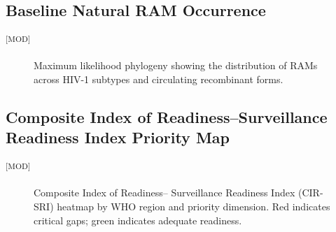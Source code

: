 \documentclass[12pt]{article}
\newcommand{\GradeModerate}{\textsuperscript{\textsf{[MOD]}}}
\begin{document}
\subsection{Baseline Natural RAM Occurrence}\label{sec:results_baseline}\GradeModerate



\begin{table}[htbp]
    \centering
    \caption{Baseline polymorphism frequencies at LEN RAM sites in
    treatment-na\"ive populations.}\label{tab:baseline_ram}
    
\end{table}

\begin{figure}[htbp]
    \centering
    
    \caption[Phylogenetic distribution of RAMs]{Maximum likelihood phylogeny
    showing the distribution of RAMs across HIV-1 subtypes and circulating
    recombinant forms.}\label{fig:phylogeny}
\end{figure}

\subsection{Composite Index of Readiness--Surveillance Readiness Index Priority Map}\label{sec:results_cir_sri}\GradeModerate



\begin{figure}[htbp]
    \centering
    
    \caption[CIR-SRI priority heatmap]{Composite Index of Readiness--
    Surveillance Readiness Index (CIR-SRI) heatmap by WHO region and
    priority dimension. Red indicates critical gaps; green indicates
    adequate readiness.}\label{fig:cir_sri_heatmap}
\end{figure}

\begin{table}[htbp]
    \centering
    \caption{CIR-SRI component scores and overall readiness by country.}\label{tab:cir_sri_scores}
    
\end{table}
\end{document}
